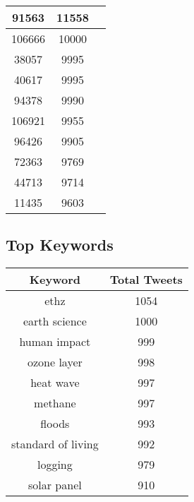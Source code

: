 \documentclass{article}\usepackage[T1]{fontenc}
\begin{document}
\begin{tabular}{|c|c|c|}
 \hline
91563 & 11558\\ 
 \hline
106666 & 10000\\ 
 \hline
38057 & 9995\\ 
 \hline
40617 & 9995\\ 
 \hline
94378 & 9990\\ 
 \hline
106921 & 9955\\ 
 \hline
96426 & 9905\\ 
 \hline
72363 & 9769\\ 
 \hline
44713 & 9714\\ 
 \hline
11435 & 9603\\ 
 \hline
\end{tabular}\subsection*{Top Keywords}\begin{tabular}{|c|c|}         \hline         Keyword & Total Tweets \\ 
 \hline
ethz & 1054\\ 
 \hline
earth science & 1000\\ 
 \hline
human impact & 999\\ 
 \hline
ozone layer & 998\\ 
 \hline
heat wave & 997\\ 
 \hline
methane & 997\\ 
 \hline
floods & 993\\ 
 \hline
standard of living & 992\\ 
 \hline
logging & 979\\ 
 \hline
solar panel & 910\\ 
 \hline
\end{tabular}
\end{document}
